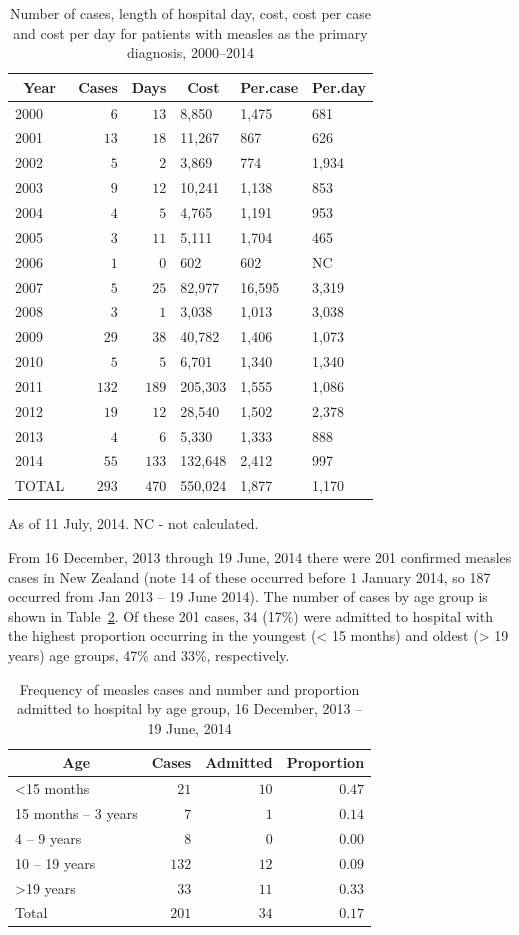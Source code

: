 \documentclass{article}
\begin{document}
\begin{table}
\caption{Number of cases, length of hospital day, cost, cost per case and cost per day for patients with measles as the primary diagnosis, 2000--2014}
\begin{center}
\begin{tabular}{lrrlll}
\hline\hline
\multicolumn{1}{c}{Year}&\multicolumn{1}{c}{Cases}&\multicolumn{1}{c}{Days}&\multicolumn{1}{c}{Cost}&\multicolumn{1}{c}{Per.case}&\multicolumn{1}{c}{Per.day}\tabularnewline
\hline
2000&$  6$&$ 13$&8,850&1,475&681\tabularnewline
2001&$ 13$&$ 18$&11,267&867&626\tabularnewline
2002&$  5$&$  2$&3,869&774&1,934\tabularnewline
2003&$  9$&$ 12$&10,241&1,138&853\tabularnewline
2004&$  4$&$  5$&4,765&1,191&953\tabularnewline
2005&$  3$&$ 11$&5,111&1,704&465\tabularnewline
2006&$  1$&$  0$&602&602&NC\tabularnewline
2007&$  5$&$ 25$&82,977&16,595&3,319\tabularnewline
2008&$  3$&$  1$&3,038&1,013&3,038\tabularnewline
2009&$ 29$&$ 38$&40,782&1,406&1,073\tabularnewline
2010&$  5$&$  5$&6,701&1,340&1,340\tabularnewline
2011&$132$&$189$&205,303&1,555&1,086\tabularnewline
2012&$ 19$&$ 12$&28,540&1,502&2,378\tabularnewline
2013&$  4$&$  6$&5,330&1,333&888\tabularnewline
2014&$ 55$&$133$&132,648&2,412&997\tabularnewline
TOTAL&$293$&$470$&550,024&1,877&1,170\tabularnewline
\hline
\end{tabular}\end{center}\label{table:hosp}
 \centering
 \begin{tablenotes}
      \small
      \item As of 11 July, 2014. NC - not calculated.
    \end{tablenotes}
\end{table}

From 16 December, 2013 through 19 June, 2014 there were 201 confirmed measles cases in New Zealand (note 14 of these occurred before 1 January 2014, so 187 occurred from Jan 2013 -- 19 June 2014). The number of cases by age group is shown in Table~\ref{table:freq}. Of these 201 cases, 34 (17\%) were admitted to hospital with the highest proportion occurring in the youngest (< 15 months) and oldest (> 19 years) age groups, 47\% and 33\%, respectively.


\begin{table}
\caption{Frequency of measles cases and number and proportion admitted to hospital by age group, 16 December, 2013 -- 19 June, 2014}
\begin{center}
\begin{tabular}{lrrr}
\hline\hline
\multicolumn{1}{c}{Age}&\multicolumn{1}{c}{Cases}&\multicolumn{1}{c}{Admitted}&\multicolumn{1}{c}{Proportion}\tabularnewline
\hline
\textless  15 months&$ 21$&$10$&$0.47$\tabularnewline
15 months – 3 years&$  7$&$ 1$&$0.14$\tabularnewline
4 – 9 years&$  8$&$ 0$&$0.00$\tabularnewline
10 – 19 years&$132$&$12$&$0.09$\tabularnewline
\textgreater  19 years&$ 33$&$11$&$0.33$\tabularnewline
Total&$201$&$34$&$0.17$\tabularnewline
\hline
\end{tabular}\end{center}\label{table:freq}
\end{table}
\end{document}
